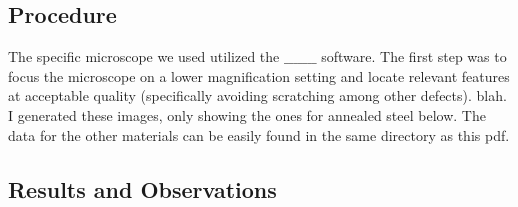 \documentclass{article}
\begin{document}
\subsection{Procedure}

The specific microscope we used utilized the $\textbf{\_\_\_\_\_\_\_}$ software. The first step was to focus the microscope on a lower magnification setting and locate relevant features at acceptable quality (specifically avoiding scratching among other defects). blah. I generated these images, only showing the ones for annealed steel below. The data for the other materials can be easily found in the same directory as this pdf.

\subsection{Results and Observations}
\end{document}

